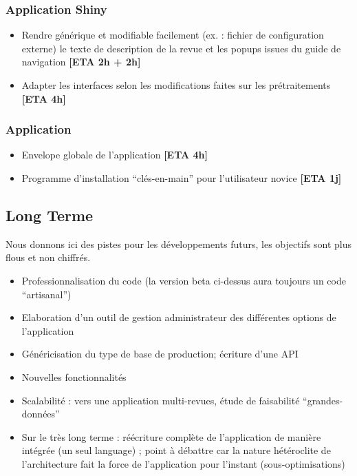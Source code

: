 \documentclass[11pt]{article}
\begin{document}
\subsubsection*{Application Shiny}

\begin{itemize}
\item Rendre générique et modifiable facilement (ex. : fichier de configuration externe) le texte de description de la revue et les popups issues du guide de navigation \textbf{[ETA 2h + 2h]}
\item Adapter les interfaces selon les modifications faites sur les prétraitements \textbf{[ETA 4h]}
\end{itemize}


\subsubsection*{Application}

\begin{itemize}
\item Envelope globale de l'application \textbf{[ETA 4h]}
\item Programme d'installation ``clés-en-main'' pour l'utilisateur novice \textbf{[ETA 1j]}
\end{itemize}





\subsection{Long Terme}

Nous donnons ici des pistes pour les développements futurs, les objectifs sont plus flous et non chiffrés.

\begin{itemize}
\item Professionnalisation du code (la version beta ci-dessus aura toujours un code ``artisanal'')
\item Elaboration d'un outil de gestion administrateur des différentes options de l'application
\item Généricisation du type de base de production; écriture d'une API
\item Nouvelles fonctionnalités
\item Scalabilité : vers une application multi-revues, étude de faisabilité ``grandes-données''
\item Sur le très long terme : réécriture complète de l'application de manière intégrée (un seul language) ; point à débattre car la nature hétéroclite de l'architecture fait la force de l'application pour l'instant (sous-optimisations) 
\end{itemize}
\end{document}
